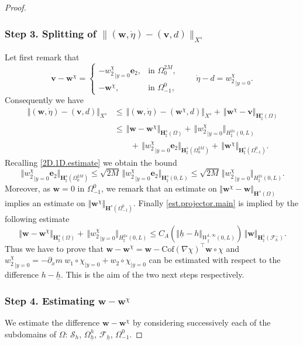 \documentclass[11pt]{article}
\let\mathcal\mathscr
\theoremstyle{remark}
\theoremstyle{definition}
\newcommand{\norme}[1]{\,\Vert #1\Vert}
\newcommand{\vnorme}[1]{\Vert #1\Vert}
\newcommand{\vg}{\boldsymbol{v}}
\newcommand{\wg}{\boldsymbol{w}}
\newcommand{\BS}[1]{\boldsymbol{#1}}
\let\CM\Omega
\newcommand{\etap}{\dot{\eta}}
\newcommand{\hb}{{\underline{h}}}
\newcommand{\Cof}{\mathrm{Cof}}
\begin{document}
\begin{proof}
\subsubsection*{Step 3. Splitting of $\|(\wg,\etap) - (\vg,d)\|_{X^s}$}
Let first remark that
\[\vg - \wg^\chi =\begin{cases}
-{w_{2}^\chi}_{|{y=0}}\BS{e}_{2},&\text{in } \Omega^{2M}_{0},\\
-\wg^\chi, & \text{in }\Omega^{0}_{-1},
\end{cases}
\qquad
\etap -d ={w_{2}^\chi}_{|{y=0}}.
\]
Consequently we have
\[
\begin{aligned}
\norme{(\wg,\etap) - (\vg,d)}_{X^s}&\leq \norme{(\wg,\etap) - (\wg^\chi,d)}_{X^s} +\norme{\wg^\chi - \vg}_{\BS{H}^{s}_{\sharp}(\CM)}\\
&\leq \norme{\wg -\wg^\chi}_{\BS{H}^{s}_{\sharp}(\CM)} + \norme{{w_{2}^\chi}_{|{y=0}}}_{H^{2s}_{\sharp}(0,L)} \\
& \qquad + \norme{{w_{2}^\chi}_{|{y=0}}\BS{e}_{2}}_{\BS{H}^{s}_{\sharp}(\Omega^{2M}_{0})}+\norme{\wg^\chi}_{\BS{H}^{s}_{\sharp}(\Omega_{-1}^{0})}.
\end{aligned}
\]
Recalling \eqref{2D.1D.estimate} we obtain the bound
\[\norme{{w_{2}^\chi}_{|{y=0}}\BS{e}_{2}}_{\BS{H}_\sharp^{s}(\Omega_{0}^{2M})}\leq \sqrt{2M}\norme{{w_{2}^\chi}_{|{y=0}}\BS{e}_{2}}_{\BS{H}_\sharp^{s}(0,L)}\leq \sqrt{2M}\norme{{w_{2}^\chi}_{|{y=0}}}_{H_\sharp^{2s}(0,L)}.\]
Moreover, as $\wg=0$ in $\Omega^{0}_{-1}$, we remark that an estimate on $\vnorme{\wg^\chi - \wg}_{\BS{H}^{s}(\CM)}$ implies an estimate on $\vnorme{\wg^\chi}_{\BS{H}^{s}(\Omega_{-1}^{0})}$. Finally \eqref{est.projector.main} is implied by the following estimate
\begin{equation}\label{est.projector.final}
\norme{\wg -\wg^\chi}_{\BS{H}^{s}_{\sharp}(\CM)}+ \norme{{w_{2}^\chi}_{|{y=0}}}_{H^{2s}_{\sharp}(0,L)}
\leq C_{A}(\vnorme{\hb -h }_{W^{1,\infty}_{\sharp}(0,L)})\norme{\wg}_{\BS{H}^{1}_{\sharp}(\mathcal{F}^{-}_{h})}.
\end{equation}
Thus we have to prove that $\wg -\wg^\chi=\wg-\Cof(\nabla \chi)^{\top}\wg\circ \chi $ and ${w_{2}^\chi}_{|{y=0}}=-\partial_x m \ w_{1}\circ\chi_{|{y=0}}+w_{2}\circ\chi_{|{y=0}}$ can be estimated with respect to the difference $h-\hb$. This is the aim of the two next steps respectively.

\subsubsection*{Step 4. Estimating $\wg -\wg^\chi$}
We estimate the difference $\wg - \wg^{\chi}$
by considering successively each of the subdomains of $\Omega$: $\mathcal{S}_{h}$, $\Omega_{\hb}^{h}$, $\mathcal{F}_{\hb}$, $\Omega_{-1}^{0}$.


\end{proof}
\end{document}
